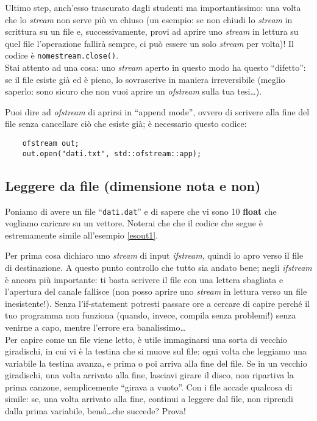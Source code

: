 Ultimo step, anch'esso trascurato dagli studenti ma importantissimo: una volta che  lo \emph{stream} non serve più va chiuso (un esempio: se non chiudi lo \emph{stream} in scrittura su un file e, successivamente, provi ad aprire uno \emph{stream} in lettura su quel file l'operazione fallirà sempre, ci può essere un solo \emph{stream} per volta)! Il codice è \verb|nomestream.close()|. \\

Stai attento ad una cosa: uno \emph{stream} aperto in questo modo ha questo ``difetto'': se il file esiste già ed è pieno, lo sovrascrive in maniera irreversibile (meglio saperlo: sono sicuro che non vuoi aprire un \emph{ofstream} sulla tua tesi\ldots). 

Puoi dire ad \emph{ofstream} di aprirsi in ``append mode'', ovvero di scrivere alla fine del file senza cancellare ciò che esiste già; è necessario questo codice:
\begin{lstlisting}
	ofstream out;
	out.open("dati.txt", std::ofstream::app);
\end{lstlisting}
\subsection{Leggere da file (dimensione nota e non)}
Poniamo di avere un file ``\verb|dati.dat|'' e di sapere che vi sono 10 \textbf{float} che vogliamo caricare su un vettore. Noterai che che il codice che segue è estremamente simile all'esempio \ref{esout1}.


Per prima cosa dichiaro uno \emph{stream} di input \emph{ifstream}, quindi lo apro verso il file di destinazione. A questo punto controllo che tutto sia andato bene; negli \emph{ifstream} è ancora più importante: ti basta scrivere il file con una lettera sbagliata e l'apertura del canale fallisce (non posso aprire uno \emph{stream} in lettura verso un file inesistente!). Senza l'if-statement potresti passare ore a cercare di capire perché il tuo programma non funziona (quando, invece, compila senza problemi!) senza venirne a capo, mentre l'errore era banalissimo\ldots \\

Per capire come un file viene letto, è utile immaginarsi una sorta di vecchio giradischi, in cui vi è la testina che si muove sul file: ogni volta che leggiamo una variabile la testina avanza, e prima o poi arriva alla fine del file. Se in un vecchio giradischi, una volta arrivato alla fine, lasciavi girare il disco, non ripartiva la prima canzone, semplicemente ``girava a vuoto''. Con i file accade qualcosa di simile: se, una volta arrivato alla fine, continui a leggere dal file, non riprendi dalla prima variabile, bensì\ldots che succede? Prova!

